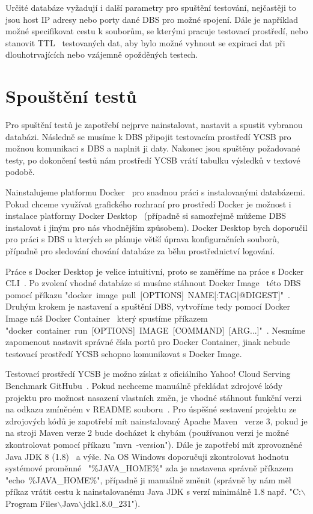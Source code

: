 \documentclass[czech,master,dept460,male,csharp,cpdeclaration]{diploma}
\begin{document}
	Určité databáze vyžadují i další parametry pro spuštění testování, nejčastěji to jsou host IP adresy nebo porty dané DBS pro možné spojení. Dále je například možné specifikovat cestu k souborům, se kterými pracuje testovací prostředí, nebo stanovit TTL~\cite{ttl} testovaných dat, aby bylo možné vyhnout se expiraci dat při dlouhotrvajících nebo vzájemně opožděných testech.
	
	\section{Spouštění testů}
	
	Pro spuštění testů je zapotřebí nejprve nainstalovat, nastavit a spustit vybranou databázi. Následně se musíme k DBS připojit testovacím prostředí YCSB pro možnou komunikaci s DBS a naplnit ji daty. Nakonec jsou spuštěny požadované testy, po dokončení testů nám prostředí YCSB vrátí tabulku výsledků v textové podobě.
	
	Nainstalujeme platformu Docker~\cite{docker-console} pro snadnou práci s instalovanými databázemi. Pokud chceme využívat grafického rozhraní pro prostředí Docker je možnost i instalace platformy Docker Desktop~\cite{docker-desktop, docker-cli} (případně si samozřejmě můžeme DBS instalovat i jiným pro nás vhodnějším způsobem). Docker Desktop bych doporučil pro práci s DBS u kterých se plánuje větší úprava konfiguračních souborů, případně pro sledování chování databáze za běhu prostřednictví logování.
	
	Práce s Docker Desktop je velice intuitivní, proto se zaměříme na práce s Docker CLI~\cite{docker-cli}. Po zvolení vhodné databáze si musíme stáhnout Docker Image~\cite{docker-image-container} této DBS~\cite{docker-hub} pomocí příkazu "docker~image~pull~[OPTIONS]~NAME[:TAG|@DIGEST]"~\cite{docker-image-pull}. Druhým krokem je nastavení a spuštění DBS, vytvoříme tedy pomocí Docker Image náš Docker Container~\cite{docker-image-container} který spustíme příkazem "docker~container~run~[OPTIONS]~IMAGE~[COMMAND]~[ARG...]"~\cite{docker-container-run}. Nesmíme zapomenout nastavit správné čísla portů pro Docker Container, jinak nebude testovací prostředí YCSB schopno komunikovat s Docker Image. 
	
	Testovací prostředí YCSB je možno získat z oficiálního Yahoo! Cloud Serving Benchmark GitHubu~\cite{ycsb}. Pokud nechceme manuálně překládat zdrojové kódy projektu pro možnost nasazení vlastních změn, je vhodné stáhnout funkční verzi na odkazu zmíněném v README souboru~\cite{ycsb-download}. Pro úspěšné sestavení projektu ze zdrojových kódů je zapotřebí mít nainstalovaný Apache Maven~\cite{maven} verze 3, pokud je na stroji Maven verze 2 bude docházet k chybám (používanou verzi je možné zkontrolovat pomocí příkazu "mvn~-version"). Dále je zapotřebí mít zprovozněné Java JDK 8 (1.8)~\cite{java-jdk} a výše. Na OS Windows doporučuji zkontrolovat hodnotu systémové proměnné~\cite{win-env-var} "\%JAVA\_HOME\%" zda je nastavena správně příkazem "echo~\%JAVA\_HOME\%", případně ji manuálně změnit (správně by nám měl příkaz vrátit cestu k nainstalovanému Java JDK s verzí minimálně 1.8 např. "C:$\backslash$Program Files$\backslash$Java$\backslash$jdk1.8.0\_231").
	
\end{document}
